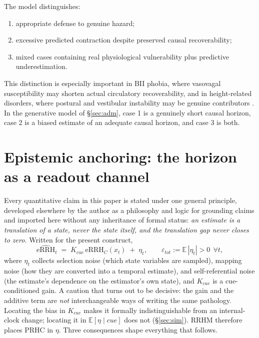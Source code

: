 \documentclass[9pt,twocolumn]{article}
\newcommand{\eRRHc}{\mathrm{eRRH}_{C}}
\newcommand{\eRRHhat}{\widehat{\mathrm{eRRH}}}
\begin{document}
The model distinguishes:
\begin{enumerate}
\item appropriate defense to genuine hazard;
\item excessive predicted contraction despite preserved causal recoverability;
\item mixed cases containing real physiological vulnerability plus predictive underestimation.
\end{enumerate}

This distinction is especially important in BII phobia, where vasovagal susceptibility may shorten actual circulatory recoverability, and in height-related disorders, where postural and vestibular instability may be genuine contributors \cite{ayala2009,ritz2010,huppert2020}. In the generative model of \S\ref{sec:adm}, case 1 is a genuinely short causal horizon, case 2 is a biased estimate of an adequate causal horizon, and case 3 is both.

\section{Epistemic anchoring: the horizon as a readout channel}
\label{sec:anchor}
Every quantitative claim in this paper is stated under one general principle, developed elsewhere by the author as a philosophy and logic for grounding claims \cite{lahtee2026ru,lahtee2026rc} and imported here without any inheritance of formal status: \emph{an estimate is a translation of a state, never the state itself, and the translation gap never closes to zero.} Written for the present construct,
\begin{equation}
\eRRHhat_t \;=\; K_{cue}\,\eRRHc(x_t)\;+\;\eta_t,\qquad \varepsilon_{tot}:=\mathbb{E}\,|\eta_t|>0\ \ \forall t,
\label{eq:recordlaw}
\end{equation}
where $\eta_t$ collects selection noise (which state variables are sampled), mapping noise (how they are converted into a temporal estimate), and self-referential noise (the estimate's dependence on the estimator's own state), and $K_{cue}$ is a cue-conditioned gain. A caution that turns out to be decisive: the gain and the additive term are \emph{not} interchangeable ways of writing the same pathology. Locating the bias in $K_{cue}$ makes it formally indistinguishable from an internal-clock change; locating it in $\mathbb{E}[\eta\mid cue]$ does not (\S\ref{sec:sim}). RRHM therefore places PRHC in $\eta$. Three consequences shape everything that follows.
\end{document}
